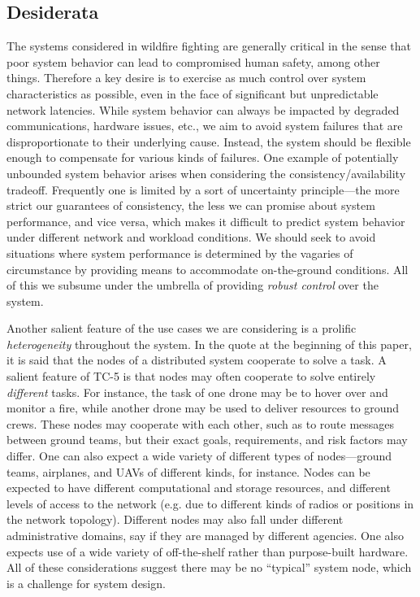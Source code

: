 \subsection{Desiderata}

The systems considered in wildfire fighting are generally critical in the sense
that poor
system behavior can lead to compromised human safety, among other things.
Therefore a key desire is to exercise as much control over system
characteristics as possible, even in the face of significant but unpredictable
network latencies. While system behavior can always be impacted by degraded
communications, hardware issues, etc., we aim to avoid system failures that are
disproportionate to their underlying cause. Instead, the system should be
flexible enough to compensate for various kinds of failures. One example of
potentially unbounded system behavior arises when considering the
consistency/availability tradeoff. Frequently one is limited by a sort of
uncertainty principle---the more strict our guarantees of consistency, the less
we can promise about system performance, and vice versa, which makes it
difficult to predict system behavior under different network and workload
conditions. We should seek to avoid situations where system performance is
determined by the vagaries of circumstance by providing means to accommodate
on-the-ground conditions. All of this we subsume under the umbrella of providing
\emph{robust control} over the system.

Another salient feature of the use cases we are considering is a prolific
\emph{heterogeneity} throughout
the system. In the quote at the beginning of this paper, it is said that the
nodes of a distributed system cooperate to solve a task.  A salient feature of
TC-5 is that nodes may often cooperate to solve entirely \emph{different} tasks.
For instance, the task of one drone may be to hover over and monitor a fire,
while another drone may be used to  deliver resources to ground crews. These
  nodes may cooperate with each other, such as to route messages between ground
  teams, but their exact goals, requirements, and risk factors may differ. One
  can also expect a wide variety of different types of nodes---ground teams,
  airplanes, and UAVs of different kinds, for instance. Nodes can be expected to
  have different computational and storage resources, and  different levels of
  access to the network (e.g. due to different kinds of radios or positions in
  the network topology). Different nodes may also fall under different
  administrative domains, say if they are managed by different agencies. One
  also expects use of a wide variety of off-the-shelf rather than purpose-built
  hardware. All of these considerations suggest there may be no ``typical''
  system node, which is a challenge for system design.

